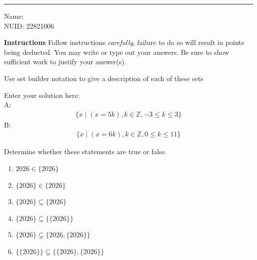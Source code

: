 \documentclass[10pt]{exam}
\begin{document}
\hrule

\vspace{.50cm} Name:
\\ NUID: 22821006
\vspace{.50cm}

\textbf{Instructions} Follow instructions \emph{carefully}, failure to do so will result in points being deducted. You may write or type out your answers. Be sure to show sufficient work to justify your answer(s).


\begin{questions}

\question[6] Use set builder notation to give a description of each of these sets

\begin{solution}
    Enter your solution here: \\
    A: 
    \begin{align*}
    \{x \mid (x = 5k), k \in \mathbb{Z}, -3 \leq k \leq 3 \}
    \end{align*}
    B: 
    \begin{align*}
    \{x \mid (x = 6k), k \in \mathbb{Z}, 0 \leq k \leq 11 \}
    \end{align*}
\end{solution}

\question[6] Determine whether these statements are true or false.
\begin{enumerate} [label=(\alph*)]
    \item $2026 \in \{2026\}$
    \item $\{2026\} \in \{2026\}$
    \item $\{2026\} \subseteq \{2026\}$
    \item $\{2026\} \subseteq \{\{2026\}\}$
    \item $\{2026\} \subsetneq \{2026, \{2026\}\}$
    \item $\{\{2026\}\} \subsetneq \{\{2026\}, \{2026\}\}$
\end{enumerate}


\end{questions}
\end{document}
